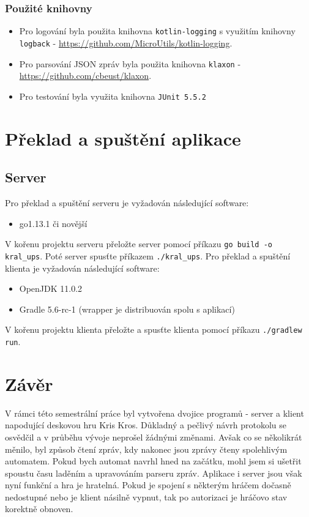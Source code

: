 \documentclass[12pt, a4paper]{article}
\let\oldsection\section
\renewcommand\section{\clearpage\oldsection}
\begin{document}
			\subsubsection{Použité knihovny}
			\begin{itemize}
				\item Pro logování byla použita knihovna \texttt{kotlin-logging} s využitím knihovny \texttt{logback} - \href{https://github.com/MicroUtils/kotlin-logging}{https://github.com/MicroUtils/kotlin-logging}. 

	\item Pro parsování JSON zpráv byla použita knihovna \texttt{klaxon} -\\ \href{https://github.com/cbeust/klaxon}{https://github.com/cbeust/klaxon}. 
		\item Pro testování byla využita knihovna \texttt{JUnit 5.5.2}
			\end{itemize}
			
	\section{Překlad a spuštění aplikace}
	\subsection{Server}
	Pro překlad a spuštění serveru je vyžadován následující software:
	\begin{itemize}
		\item go1.13.1 či novější
	\end{itemize}
	V kořenu projektu serveru přeložte server pomocí příkazu \texttt{go build -o kral\_ups}. Poté server spusťte příkazem \texttt{./kral\_ups}.
	Pro překlad a spuštění klienta je vyžadován následující software:
	\begin{itemize}
		\item OpenJDK 11.0.2
		\item Gradle 5.6-rc-1 (wrapper je distribuován spolu s aplikací)
	\end{itemize}
	V kořenu projektu klienta přeložte a spusťte klienta pomocí příkazu \texttt{./gradlew run}.

    \section{Závěr}
    V rámci této semestrální práce byl vytvořena dvojice programů - server a klient napodující deskovou hru Kris Kros. Důkladný a pečlivý návrh protokolu se osvědčil a v průběhu vývoje neprošel žádnými změnami. Avšak co se několikrát měnilo, byl způsob čtení zpráv, kdy nakonec jsou zprávy čteny spolehlivým automatem. Pokud bych automat navrhl hned na začátku, mohl jsem si ušetřit spoustu času laděním a upravováním parseru zpráv. Aplikace i server jsou však nyní funkční a hra je hratelná. Pokud je spojení s některým hráčem dočasně nedostupné nebo je klient násilně vypnut, tak po autorizaci je hráčovo stav korektně obnoven.
    



	
	
\end{document}
